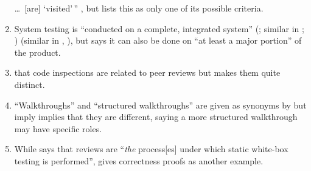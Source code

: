 \begin{enumerate}
          \dots\ [are] `visited'\,'' \citep[p.~19]{IEEE2021}, but
          \citet[pp.~82\==83]{Patton2006} lists this as only one of its
          possible criteria.
    \item %
          System testing is ``conducted on a complete, integrated system''
          \ifnotpaper (\citealp[p.~456]{IEEE2017}; similar in
              \citealp[Tab.~12.3]{PetersAndPedrycz2000};
              \citealp[p.~439]{vanVliet2000})\else \cite[p.~456]{IEEE2017}
              (similar in \cite[Tab.~12.3]{PetersAndPedrycz2000},
              \cite[p.~439]{vanVliet2000})\fi, but \citet[p.~109]{Patton2006}
          says it can also be done on ``at least a major portion'' of the product.
    \item %
           \citetISTQB{}  that code inspections
          are related to peer reviews but \citet[pp.~94\==95]{Patton2006} makes
          them quite distinct.
    \item %
          ``Walkthroughs'' and ``structured walkthroughs'' are given
          as synonyms by \citetISTQB{} but \citet[p.~484]{PetersAndPedrycz2000}
          \ifnotpaper imply \else implies \fi that they are different, saying a
          more structured walkthrough may have specific roles.
    \item %
          While \citet[p.~92\ifnotpaper, emphasis added\fi]{Patton2006}
          says that reviews are ``\emph{the} process[es] under which static
          white-box testing is performed'', \citet[pp.~418\==419]{vanVliet2000}
          gives correctness proofs as another example.


\end{enumerate}
